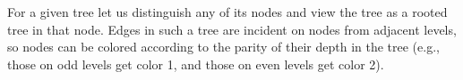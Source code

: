 For a given tree let us distinguish any of its nodes and view the tree as a rooted tree in that node.
Edges in such a tree are incident on nodes from adjacent levels, so nodes can be colored according to the parity of their depth in the tree (e.g., those on odd levels get color 1, and those on even levels get color 2).

